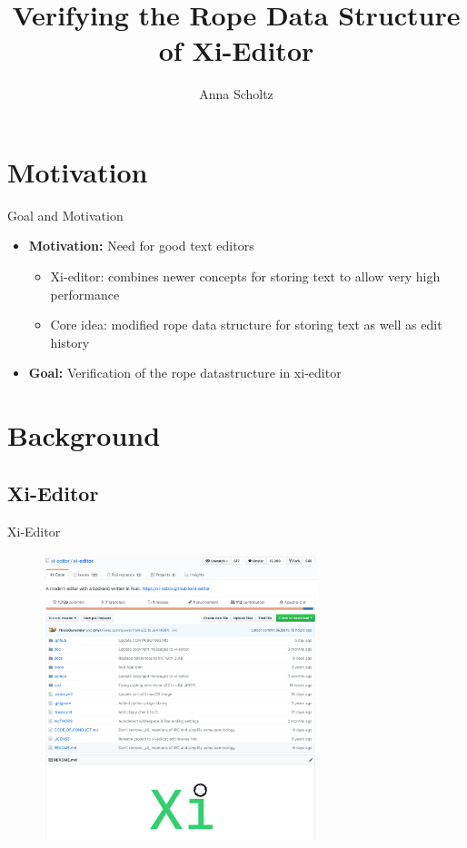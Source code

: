 \documentclass{beamer}
\begin{document}
\title[Verifying the Rope datastructure of Xi-Editor]{Verifying the Rope Data Structure of Xi-Editor}

\author{Anna Scholtz}




\frame[plain]{
    \titlepage
}




\section{Motivation}

\begin{frame}{Goal and Motivation}
  \begin{itemize}
    \item \textbf{Motivation:} Need for good text editors
    \begin{itemize}
      \item Xi-editor: combines newer concepts for storing text to allow very high performance
      \item Core idea: modified rope data structure for storing text as well as edit history
    \end{itemize}
    \item \textbf{Goal:} Verification of the rope datastructure in xi-editor  %
  \end{itemize}
\end{frame}


\section{Background}

\subsection{Xi-Editor}

\begin{frame}{Xi-Editor}
    \begin{figure}
        \centering
        \includegraphics[width=8cm]{images/xi-github.png}
    \end{figure}
\end{frame}
\end{document}
